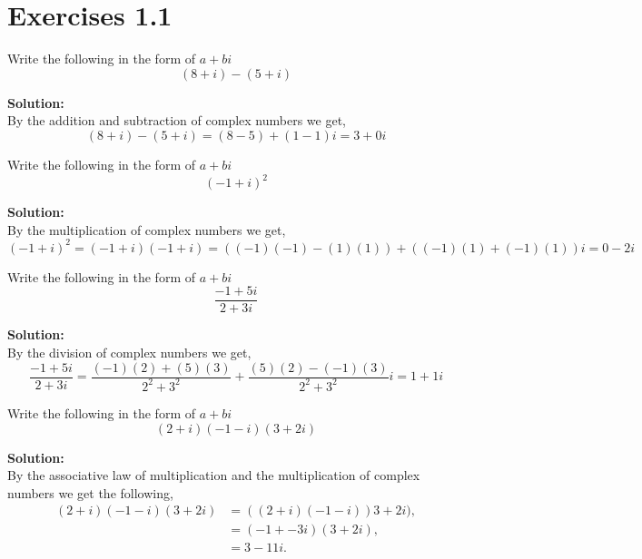 \documentclass[12pt]{article}
\makeatletter
\theoremstyle{homework}
\newenvironment{exercise}[1]
{\def\@currentlabel{#1}\exercisecore}
{\endexercisecore}
\newcommand{\localhead}[1]{\par\smallskip\noindent\textbf{#1}\nobreak\\}%
\newcommand\solution{\localhead{Solution:}}
\makeatother
\begin{document}
\section*{Exercises 1.1}

\begin{exercise}{5(b)} Write the following in the form of $a + bi$
    \begin{equation*}
        (8 + i)-(5 + i)
    \end{equation*}
    \solution By the addition and subtraction of complex numbers we get, 
    \begin{equation*}
        (8 + i)-(5 + i) = (8 - 5) + (1 - 1)i = 3 + 0i
    \end{equation*}
\end{exercise}
\vspace{1in}


\begin{exercise}{6(a)} Write the following in the form of $a + bi$
    \begin{equation*}
        (-1 + i)^2
    \end{equation*}
    \solution By the multiplication of complex numbers we get, 
    \begin{equation*}
        (-1 + i)^2 =  (-1 + i)(-1 + i) = ((-1)(-1)-(1)(1)) + ((-1)(1) + (-1)(1))i = 0 - 2i
    \end{equation*}
\end{exercise}
\vspace{1in}



\begin{exercise}{7(b)} Write the following in the form of $a + bi$
    \begin{equation*}
        \dfrac{-1 + 5i}{2 + 3i}
    \end{equation*}
    \solution By the division of complex numbers we get, 
    \begin{equation*}
        \dfrac{-1 + 5i}{2 + 3i} = \dfrac{(-1)(2) + (5)(3)}{2^2 + 3^2} +  \dfrac{(5)(2) - (-1)(3)}{2^2 + 3^2}i = 1+1i
    \end{equation*}
\end{exercise}
\vspace{1in}

\begin{exercise}{12} Write the following in the form of $a + bi$
    \begin{equation*}
        (2+i)(-1-i)(3+2i)
    \end{equation*}
    \solution By the associative law of multiplication and the multiplication of complex numbers we get the following, 
    \begin{align*}
        (2+i)(-1-i)(3+2i) &= ((2+i)(-1-i))3+2i),\\
        &= (-1 + -3i)(3+2i),\\
        &= 3 - 11i.
    \end{align*}
\end{exercise}
\vspace{1in}
\end{document}
